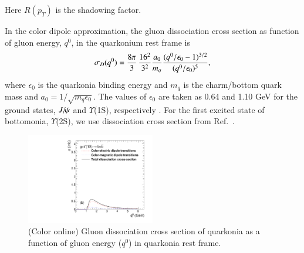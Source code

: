 {  Here $R(p_T)$ is the shadowing factor.
  


  In the color dipole approximation, the gluon dissociation cross section as function of gluon energy, $q^0$,
  in the quarkonium rest frame is~\cite{Bhanot:1979vb}
  \begin{equation}
    \sigma_{D}(q^{0}) = {8\pi \over 3} \, {16^2 \over 3^2} {a_0 \over m_q}  \frac{(q^0/\epsilon_0 - 1)^{3/2}} {(q^0/\epsilon_0)^5},
  \end{equation}
  where $\epsilon_0$ is the quarkonia binding energy and $m_q$ is the charm/bottom quark mass 
  and $a_0=1/\sqrt{m_q\epsilon_0}$.
  The values of $\epsilon_0$ are taken as 0.64 and 1.10 GeV for the ground states, $J\hspace{-.08em}/\hspace{-.14em}\psi$ and $\Upsilon$(1S),
  respectively \cite{Karsch:1987pv}.
  For the first excited state of bottomonia, $\Upsilon$(2S), we use dissociation
  cross section from Ref.~\cite{Arleo:2001mp}.

  \begin{figure}
    \begin{center}
    \includegraphics[width=0.50\textwidth]{Figures/Quarkonia_502TeV/Fig1b_Y1S_SigmaDq0.pdf}
    \caption{(Color online) Gluon dissociation cross section of quarkonia as a function of gluon energy ($q^{0}$) in
      quarkonia rest frame.}
    \label{fig:SigmaDQ0}
    \end{center}
  \end{figure}

}

